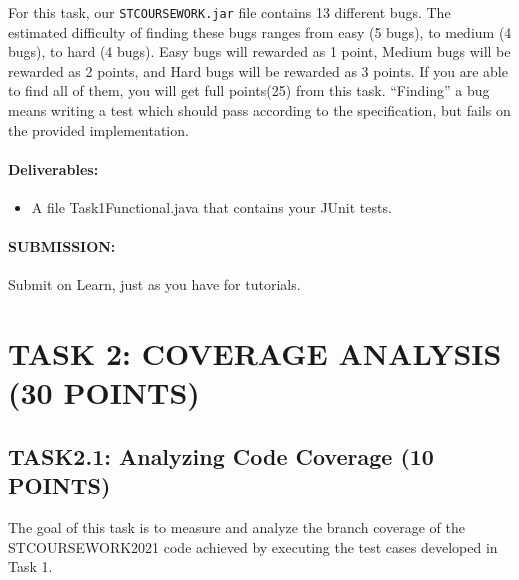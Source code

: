 \documentclass{article}
\begin{document}
For this task, our \texttt{ST\textunderscore COURSEWORK.jar} file
contains 13 different bugs.
The estimated difficulty of finding these bugs ranges from easy (5
bugs), to medium (4 bugs), to hard (4 bugs). Easy bugs will rewarded
as 1 point, Medium bugs will be rewarded as 2 points, and Hard bugs
will be rewarded as 3 points. If you are able to find all of them, you
will get full points(25) from this task.
``Finding'' a bug means writing a test which should pass according to
the specification, but fails on the provided implementation.

\paragraph{Deliverables:}
\begin{itemize}
    \item A file Task1\textunderscore Functional.java
      that contains your JUnit tests.
\end{itemize}
 
\paragraph{SUBMISSION:}

Submit on Learn, just as you have for tutorials.

\section{TASK 2: COVERAGE ANALYSIS (30 POINTS)}

\subsection{TASK2.1: Analyzing Code Coverage (10 POINTS)}

The goal of this task is to measure and analyze the branch coverage of
the STCOURSEWORK2021 code achieved by executing the
test cases developed in Task 1.

\end{document}
